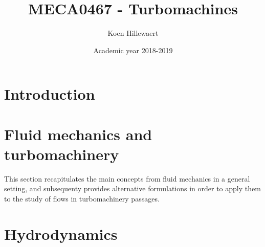 \documentclass[12pt]{report}
\title{MECA0467 - Turbomachines}
\author{Koen Hillewaert}
\date{Academic year 2018-2019}
\begin{document}
\maketitle
\tableofcontents


\chapter{Introduction}



\chapter{Fluid mechanics and turbomachinery}
\label{chap:principles}

This section recapitulates the main concepts from fluid mechanics in a
general setting, and subsequenty provides alternative formulations in
order to apply them to the study of flows in turbomachinery passages.


\clearpage

\clearpage

\clearpage

\clearpage

\clearpage


\clearpage



\chapter{Hydrodynamics}
\label{chap:hydrodynamics}


\clearpage


  \clearpage
  
  \clearpage
  
\clearpage


\end{document}
